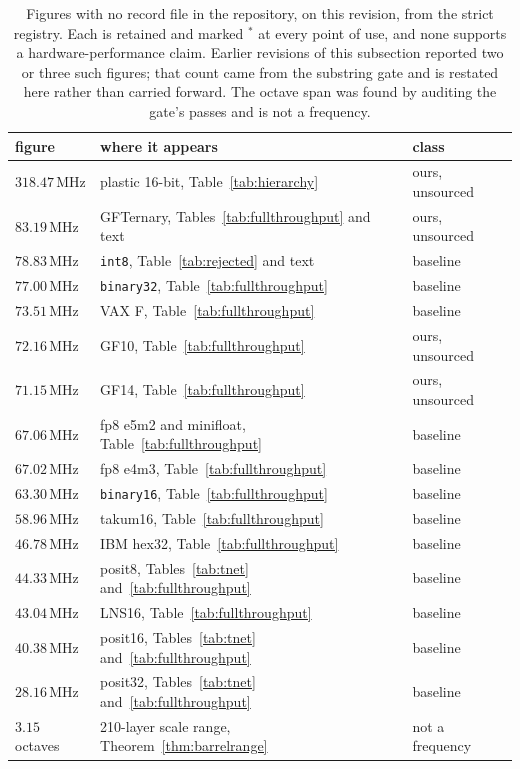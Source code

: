 \documentclass[11pt]{article}
\theoremstyle{definition}
\begin{document}
\begin{table}[t]\centering
\caption{Figures with no record file in the repository, on this revision, from the
strict registry. Each is retained and marked $^{\ast}$ at every point of use, and
none supports a hardware-performance claim. Earlier revisions of this subsection
reported two or three such figures; that count came from the substring gate and is
restated here rather than carried forward. The octave span was found by auditing
the gate's passes and is not a frequency.}
\label{tab:untraced}
\begin{tabular}{lll}
\toprule
figure & where it appears & class \\
\midrule
$318.47$\,MHz & plastic 16-bit, Table~\ref{tab:hierarchy} & ours, unsourced \\
$83.19$\,MHz & GFTernary, Tables~\ref{tab:fullthroughput} and text & ours, unsourced \\
$78.83$\,MHz & \texttt{int8}, Table~\ref{tab:rejected} and text & baseline \\
$77.00$\,MHz & \texttt{binary32}, Table~\ref{tab:fullthroughput} & baseline \\
$73.51$\,MHz & VAX F, Table~\ref{tab:fullthroughput} & baseline \\
$72.16$\,MHz & GF10, Table~\ref{tab:fullthroughput} & ours, unsourced \\
$71.15$\,MHz & GF14, Table~\ref{tab:fullthroughput} & ours, unsourced \\
$67.06$\,MHz & fp8 e5m2 and minifloat, Table~\ref{tab:fullthroughput} & baseline \\
$67.02$\,MHz & fp8 e4m3, Table~\ref{tab:fullthroughput} & baseline \\
$63.30$\,MHz & \texttt{binary16}, Table~\ref{tab:fullthroughput} & baseline \\
$58.96$\,MHz & takum16, Table~\ref{tab:fullthroughput} & baseline \\
$46.78$\,MHz & IBM hex32, Table~\ref{tab:fullthroughput} & baseline \\
$44.33$\,MHz & posit8, Tables~\ref{tab:tnet} and~\ref{tab:fullthroughput} & baseline \\
$43.04$\,MHz & LNS16, Table~\ref{tab:fullthroughput} & baseline \\
$40.38$\,MHz & posit16, Tables~\ref{tab:tnet} and~\ref{tab:fullthroughput} & baseline \\
$28.16$\,MHz & posit32, Tables~\ref{tab:tnet} and~\ref{tab:fullthroughput} & baseline \\
\addlinespace
$3.15$ octaves & 210-layer scale range, Theorem~\ref{thm:barrelrange} & not a frequency \\
\bottomrule
\end{tabular}
\end{table}
\end{document}

